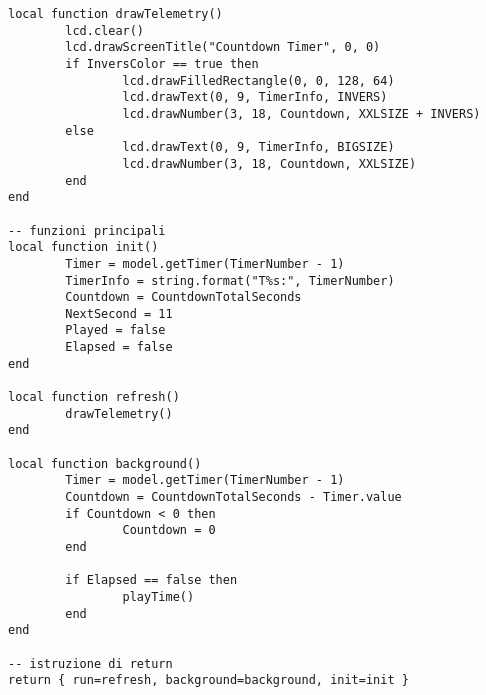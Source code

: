 \begin{lstlisting}
local function drawTelemetry()
        lcd.clear() 
        lcd.drawScreenTitle("Countdown Timer", 0, 0)
        if InversColor == true then
                lcd.drawFilledRectangle(0, 0, 128, 64)
                lcd.drawText(0, 9, TimerInfo, INVERS)
                lcd.drawNumber(3, 18, Countdown, XXLSIZE + INVERS)
        else
                lcd.drawText(0, 9, TimerInfo, BIGSIZE)
                lcd.drawNumber(3, 18, Countdown, XXLSIZE)
        end
end

-- funzioni principali
local function init()
        Timer = model.getTimer(TimerNumber - 1)
        TimerInfo = string.format("T%s:", TimerNumber)
        Countdown = CountdownTotalSeconds
        NextSecond = 11
        Played = false
        Elapsed = false
end

local function refresh()
        drawTelemetry()
end

local function background()
        Timer = model.getTimer(TimerNumber - 1)
        Countdown = CountdownTotalSeconds - Timer.value
        if Countdown < 0 then
                Countdown = 0
        end

        if Elapsed == false then
                playTime()
        end
end

-- istruzione di return
return { run=refresh, background=background, init=init }
\end{lstlisting}

\clearpage

